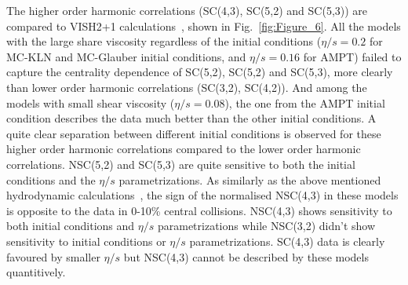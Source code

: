 \documentclass[ALICE,manyauthors]{cernphprep}
\begin{document}
The higher order harmonic correlations (SC(4,3), SC(5,2) and SC(5,3)) are compared to VISH2+1 calculations~\cite{Zhu:2016puf}, shown in Fig.~\ref{fig:Figure_6}. 
All the models with the large share viscosity regardless of the initial conditions ($\eta/s=0.2$ for MC-KLN and MC-Glauber initial conditions, and $\eta/s=0.16$ for AMPT) failed to capture the centrality dependence of SC(5,2), SC(5,2) and SC(5,3), more clearly than lower order harmonic correlations (SC(3,2), SC(4,2)).
And among the models with small shear viscosity ($\eta/s=0.08$), the one from the AMPT initial condition describes the data much better than the other initial conditions. 
A quite clear separation between different initial conditions is observed for these higher order harmonic correlations compared to the lower order harmonic correlations.
NSC(5,2) and SC(5,3) are quite sensitive to both the initial conditions and the $\eta/s$ parametrizations.
As similarly as the above mentioned hydrodynamic calculations~\cite{Niemi:2015qia}, the sign of the normalised NSC(4,3) in these models is opposite to the data in 0-10\% central collisions. NSC(4,3) shows sensitivity to both initial conditions and $\eta/s$ parametrizations while NSC(3,2) didn't show sensitivity to initial conditions or $\eta/s$ parametrizations.
SC(4,3) data is clearly favoured by smaller $\eta/s$ but NSC(4,3) cannot be described by these models quantitively.
     
\end{document}
